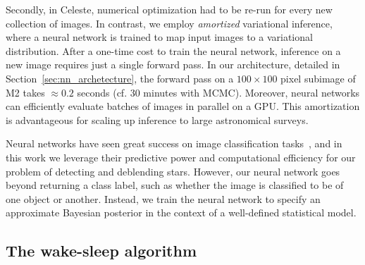 Secondly, in Celeste, numerical optimization had to be re-run for every new collection of images. 
In contrast, we employ {\itshape amortized} variational inference, where a neural network is trained to map input images to a variational distribution.
After a one-time cost to train the neural network, inference 
on a new image requires just a single forward pass.
In our architecture, detailed in Section~\ref{sec:nn_archetecture}, the forward pass on 
a $100 \times 100$ pixel subimage of M2 takes $\approx 0.2$ seconds (cf. 30 minutes with MCMC). 
Moreover, neural networks can efficiently evaluate batches of images in parallel on a GPU. 
This amortization is advantageous for scaling up inference to large astronomical surveys.

Neural networks have seen great success on image classification tasks~\cite{imagenet2015}, and in this work we leverage their predictive power and computational efficiency for our problem of detecting and deblending stars.
However, our neural network goes beyond returning a class label, such as whether the image is classified to be of one object or another. 
Instead, we train the neural network to specify an approximate Bayesian posterior in the context of a well-defined statistical model. 

\subsection{The wake-sleep algorithm}

